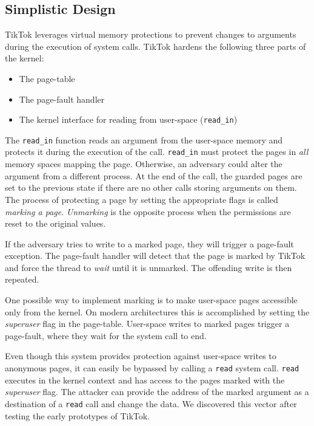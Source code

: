 \documentclass[conference]{IEEEtran}
\newcommand{\pra}[1]{\textcolor{blue}{\textbf{PS:} #1}}
\newcommand{\sysname}{TikTok}
\begin{document}
\subsection{Simplistic Design}
\label{subsec:simplistic}

\sysname{} leverages virtual memory protections to
prevent changes to arguments during the execution of system calls.
\sysname{} hardens the following three parts of the kernel:

\begin{itemize}
\item The page-table
\item The page-fault handler
\item The kernel interface for reading from user-space (\texttt{read\_in})
\end{itemize}

The \texttt{read\_in} function reads an argument from the user-space memory and
protects it during the execution of the call. \texttt{read\_in} must protect the
pages in \emph{all} memory spaces mapping the page. Otherwise, an adversary
could alter the argument from a different process. At the end of the call, the
guarded pages are set to the previous state if there are no other calls storing
arguments on them. The process of protecting a page by setting the appropriate
flags is called \emph{marking a page}. \emph{Unmarking} is the opposite process
when the permissions are reset to the original values.

If the adversary tries to write to a marked page, they will trigger a
page-fault exception. The page-fault handler will detect that the page is marked
by \sysname{} and force the thread to \emph{wait} until it is unmarked. The
offending write is then repeated. 

One possible way to implement marking is to make user-space pages accessible
only from the kernel.  On modern architectures this is accomplished by setting
the \emph{superuser} flag in the page-table. User-space writes to marked pages
trigger a page-fault, where they wait for the system call to end.

Even though this system provides protection against user-space
writes to anonymous pages, it can easily be bypassed by calling a \texttt{read}
system call. \texttt{read} executes in the kernel context and has access to 
the pages marked with the \emph{superuser} flag. The attacker can provide the
address of the marked argument as a destination of a \texttt{read} call and 
change the data. We discovered this vector after testing the early prototypes of
\sysname{}.
\end{document}
